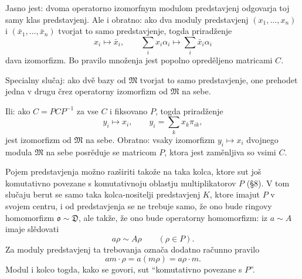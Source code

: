 \documentclass[11pt]{article}
\providecommand{\mo}{\mathfrak{o}}
\providecommand{\mM}{\mathfrak{M}}
\begin{document}
Jasno jest: dvoma operatorno izomorfnym modulom predstavjenj odgovarja toj samy klas predstavjenj. Ale i obratno: ako dva moduly predstavjenj $(x_1,\ldots,x_n)$ i $(\bar x_1,\ldots,\bar x_n)$ tvorjat to samo predstavjenje, togda priradženje
\[
        x_i\mapsto\bar x_i,
        \qquad
        \sum_i x_i\alpha_i\mapsto\sum_i\bar x_i\alpha_i
\]
dava izomorfizm. Bo pravilo množenja jest popolno opreděljeno matricami $C$.

Specialny slučaj: ako dvě bazy od $\mM$ tvorjat to samo predstavjenje, one prehodet jedna v drugu črez operatorny izomorfizm od $\mM$ na sebe.

Ili: ako $C=PCP^{-1}$ za vse $C$ i fiksovano $P$, togda priradženje
\[
        y_i\mapsto x_i,
        \qquad y_i=\sum_kx_k\pi_{ik},
\]
jest izomorfizm od $\mM$ na sebe. Obratno: vsaky izomorfizm $y_i\mapsto x_i$ dvojnego modula $\mM$ na sebe posrěduje se matricom $P$, ktora jest zaměnljiva so vsimi $C$.

Pojem predstavjenja možno razširiti takože na taka kolca, ktore sut još komutativno povezane s komutativnoju oblastju multiplikatorov $P$ (§8). V tom slučaju berut se samo taka kolca-nositelji predstavjenj $K$, ktore imajut $P$ v svojem centru, i od predstavjenja se ne trebuje samo, že ono bude ringovy homomorfizm $\mo\sim\mathfrak D$, ale takže, že ono bude operatorny homomorfizm: iz $a\sim A$ imaje slědovati
\[
        a\rho\sim A\rho\qquad(\rho\in P).
\]
Za moduly predstavjenj ta trebovanja označa dodatno računno pravilo
\[
        am\cdot\rho=a(m\rho)=a\rho\cdot m.
\]
Modul i kolco togda, kako se govori, sut ``komutativno povezane s $P$''.
\end{document}
